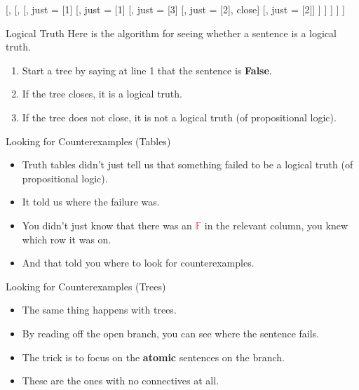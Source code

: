 \documentclass[
  ignorenonframetext,
]{beamer}
\providecommand{\tightlist}{%
  \setlength{\itemsep}{0pt}\setlength{\parskip}{0pt}}
\renewcommand{\,}{\text{, }}
\newenvironment{oltableau}{\center\tableau{}} %
       {\endtableau\endcenter}
\def\True{\mathbb{T}}
\def\False{\mathbb{F}}
\begin{document}
\begin{frame}
\begin{oltableau}
[\sFmla{\True}{\neg A \wedge B},
  [\sFmla{\True}{A \vee B},
    [\sFmla{\True}{\neg A}, just = {\TRule{\True}{\wedge}[1]}
      [\sFmla{\True}{B}, just = {\TRule{\True}{\wedge}[1]}
        [\sFmla{\False}{A}, just = {\TRule{\True}{\neg}[3]}
            [\sFmla{\True}{A}, just = {\TRule{\True}{\vee}[2]}, close]
            [\sFmla{\True}{B}, just = {\TRule{\True}{\vee}[2]}]
        ]
      ]
    ]
  ]
]
\end{oltableau}
\end{frame}

\begin{frame}{Logical Truth}
\protect\hypertarget{logical-truth}{}
Here is the algorithm for seeing whether a sentence is a logical truth.

\begin{enumerate}[<+->]
\tightlist
\item
  Start a tree by saying at line 1 that the sentence is \textbf{False}.
\item
  If the tree closes, it is a logical truth.
\item
  If the tree does not close, it is not a logical truth (of
  propositional logic).
\end{enumerate}
\end{frame}

\begin{frame}{Looking for Counterexamples (Tables)}
\protect\hypertarget{looking-for-counterexamples-tables}{}
\begin{itemize}
\tightlist
\item
  Truth tables didn't just tell us that something failed to be a logical
  truth (of propositional logic).
\item
  It told us where the failure was.
\item
  You didn't just know that there was an \textcolor{red}{$\False$} in
  the relevant column, you knew which row it was on.
\item
  And that told you where to look for counterexamples.
\end{itemize}
\end{frame}

\begin{frame}{Looking for Counterexamples (Trees)}
\protect\hypertarget{looking-for-counterexamples-trees}{}
\begin{itemize}
\tightlist
\item
  The same thing happens with trees.
\item
  By reading off the open branch, you can see where the sentence fails.
\item
  The trick is to focus on the \textbf{atomic} sentences on the branch.
\item
  These are the ones with no connectives at all.
\end{itemize}
\end{frame}
\end{document}
